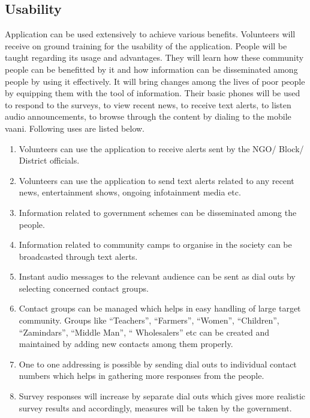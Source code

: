 \begin{itemize}
\section {Usability}

Application can be used extensively to achieve various benefits. Volunteers will receive on ground training for the usability of the application. People will be taught regarding its usage and advantages. They will learn how these community people can be benefitted by it and how information can be disseminated among people by using it effectively. It will bring changes among the lives of poor people by equipping them with the tool of information. Their basic phones will be used to respond to the surveys, to view recent news, to receive text alerts, to listen audio announcements, to browse through the content by dialing to the mobile vaani. Following uses are listed below.

\begin {enumerate}
\item Volunteers can use the application to receive alerts sent by the NGO/ Block/ District officials.
\item Volunteers can use the application to send text alerts related to any recent news, entertainment shows, ongoing infotainment media  etc.
\item Information related to government schemes can be disseminated among the people.
\item Information related to community camps to organise in the society can be broadcasted through text alerts.
\item Instant audio messages to the relevant audience can be sent as dial outs by selecting concerned contact groups.
\item Contact groups can be managed which helps in easy handling of large target community. Groups like “Teachers”, “Farmers”, “Women”, “Children”, “Zamindars”, “Middle Man”, “ Wholesalers” etc can be created and maintained by adding new contacts among them properly.
\item One to one addressing is possible by sending dial outs to individual contact numbers which helps in gathering more responses from the people.
\item Survey responses will increase by separate dial outs which gives more realistic  survey results and accordingly, measures will be taken by the government.

\end {enumerate}


\end{itemize}
